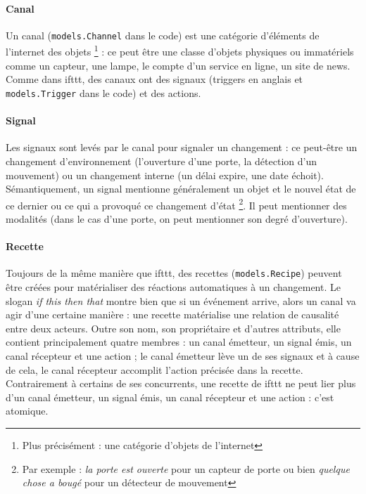 \documentclass[11pt]{article}
\begin{document}
\paragraph{Canal} Un canal (\texttt{models.Channel} dans le code) est une catégorie d'éléments de l'internet des objets \footnote{Plus précisément : une catégorie d'objets de l'internet} : ce peut être une classe d'objets physiques ou immatériels comme un capteur, une lampe, le compte d'un service en ligne, un site de news. Comme dans ifttt, des canaux ont des signaux (triggers en anglais et \texttt{models.Trigger} dans le code) et des actions.

\paragraph{Signal} Les signaux sont levés par le canal pour signaler un changement : ce peut-être un changement d'environnement (l'ouverture d'une porte, la détection d'un mouvement) ou un changement interne (un délai expire, une date échoit). Sémantiquement, un signal mentionne généralement un objet et le nouvel état de ce dernier ou ce qui a provoqué ce changement d'état \footnote{Par exemple : \textsl{la porte est ouverte} pour un capteur de porte ou bien \textsl{quelque chose a bougé} pour un détecteur de mouvement}. Il peut mentionner des modalités (dans le cas d'une porte, on peut mentionner son degré d'ouverture).

\paragraph{Recette} Toujours de la même manière que ifttt, des recettes (\texttt{models.Recipe}) peuvent être créées pour matérialiser des réactions automatiques à un changement. Le slogan \textsl{if this then that} montre bien que si un événement arrive, alors un canal va agir d'une certaine manière : une recette matérialise une relation de causalité entre deux acteurs. Outre son nom, son propriétaire et d'autres attributs, elle contient principalement quatre membres : un canal émetteur, un signal émis, un canal récepteur et une action ; le canal émetteur lève un de ses signaux et à cause de cela, le canal récepteur accomplit l'action précisée dans la recette. Contrairement à certains de ses concurrents, une recette de ifttt ne peut lier plus d'un canal émetteur, un signal émis, un canal récepteur et une action : c'est atomique.
\end{document}

